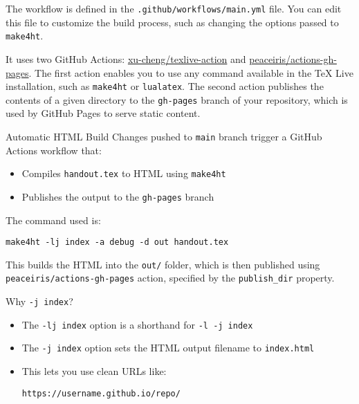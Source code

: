 The workflow is defined in the \texttt{.github/workflows/main.yml} file. 
You can edit this file to customize the build process, such as changing the
options passed to \texttt{make4ht}.

It uses two GitHub Actions: \href{https://github.com/xu-cheng/texlive-action}{xu-cheng/texlive-action}
and \href{https://github.com/peaceiris/actions-gh-pages}{peaceiris/actions-gh-pages}. 
The first action enables you to use any command available in the TeX Live installation, 
such as \texttt{make4ht} or \texttt{lualatex}. The second action publishes the contents of a 
given directory to the \texttt{gh-pages} branch of your repository, which is
used by GitHub Pages to serve static content.



\begin{frame}[fragile]{Automatic HTML Build}
Changes pushed to \texttt{main} branch trigger a GitHub Actions workflow that:

\begin{itemize}
  \item Compiles \texttt{handout.tex} to HTML using \texttt{make4ht}
  \item Publishes the output to the \texttt{gh-pages} branch
\end{itemize}

The command used is:

\begin{verbatim}
make4ht -lj index -a debug -d out handout.tex
\end{verbatim}
\end{frame}

This builds the HTML into the \texttt{out/} folder, which is then published
using \texttt{peaceiris/actions-gh-pages} action, specified by the
\texttt{publish_dir} property.

\begin{frame}[fragile]{Why \texttt{-j index}?}
\begin{itemize}
  \item The \texttt{-lj index} option is a shorthand for \texttt{-l -j index}
  \item The \texttt{-j index} option sets the HTML output filename to \texttt{index.html}
  \item This lets you use clean URLs like:
  
\begin{verbatim}
https://username.github.io/repo/
\end{verbatim}

\end{itemize}
\end{frame}

